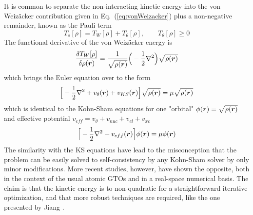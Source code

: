 It is common to separate the non-interacting kinetic energy into the von Weiz\"{a}cker contribution given in
Eq.~(\ref{eq:vonWeizacker}) plus a non-negative remainder, known as the Pauli term
\begin{equation}
    T_s[\rho] = T_W[\rho] + T_\theta[\rho], \qquad T_\theta[\rho] \geq 0
\end{equation}
The functional derivative of the von Weiz\"{a}cker energy is
\begin{equation}
    \frac{\delta T_W[\rho]}{\delta \rho(\boldsymbol r)} = 
	\frac{1}{\sqrt{\rho(\boldsymbol r)}}\Big(-\frac{1}{2}\nabla^2\Big)\sqrt{\rho(\boldsymbol r)}
\end{equation}
which brings the Euler equation over to the form
\begin{equation}
    \Big[-\frac{1}{2}\nabla^2 + v_\theta(\boldsymbol r) + v_{KS}(\boldsymbol r)\Big]\sqrt{\rho(\boldsymbol r)} =
	\mu\sqrt{\rho(\boldsymbol r)} 
\end{equation}
which is identical to the Kohn-Sham equations for one "orbital" $\phi(\boldsymbol r) = \sqrt{\rho(\boldsymbol r)}$ 
and effective potential $v_{eff} = v_\theta + v_{nuc} + v_{el} + v_{xc}$
\begin{equation}
    \label{eq:OF-orbital}
    \Big[-\frac{1}{2}\nabla^2 + v_{eff}(\boldsymbol r)\Big]\phi(\boldsymbol r) = \mu\phi(\boldsymbol r)
\end{equation}
The similarity with the KS equations have lead to the misconception that the problem can be easily solved 
to self-consistency by any Kohn-Sham solver by only minor modifications\cite{Levy:1984}. More recent
studies, however, have shown the opposite, both in the context of the usual atomic GTOs\cite{Chan:2000}
and in a real-space numerical basis\cite{Karasiev:2012}. The claim is that the kinetic energy is to non-quadratic
for a straightforward iterative optimization, and that more robust techniques are required, like the one 
presented by Jiang \etal\cite{Jiang:2004}.

